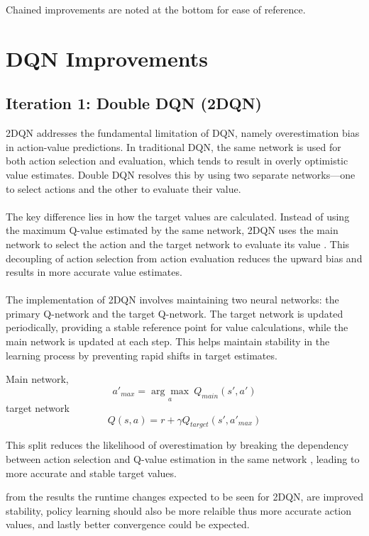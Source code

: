 \documentclass[
12pt, %
oneside, %
english, %
onehalfspacing, %
nolistspacing, %
liststotoc, %
headsepline, %
]{ProposalAndThesis} %
\begin{document}
Chained improvements are noted at the bottom for ease of reference.
\section{DQN Improvements}
\subsection{Iteration 1: Double DQN (2DQN)} 

2DQN \parencite{hasselt_deep_2015} addresses the fundamental limitation of DQN, namely overestimation bias in action-value predictions. In traditional DQN, the same network is used for both action selection and evaluation, which tends to result in overly optimistic value estimates. Double DQN resolves this by using two separate networks—one to select actions and the other to evaluate their value.
\\\\
\noindent The key difference lies in how the target values are calculated. Instead of using the maximum Q-value estimated by the same network, 2DQN uses the main network to select the action and the target network to evaluate its value \parencite{hasselt_deep_2015}. This decoupling of action selection from action evaluation reduces the upward bias and results in more accurate value estimates.
\\\\
\noindent The implementation of 2DQN involves maintaining two neural networks: the primary Q-network and the target Q-network. The target network is updated periodically, providing a stable reference point for value calculations, while the main network is updated at each step. This helps maintain stability in the learning process by preventing rapid shifts in target estimates.

Main network,
\[ a'_{max} = \underset{a}{\arg\max} \ Q_{main}(s', a')\]
target network
\[ Q(s,a) = r + \gamma Q_{target}(s',a'_{max})\]

\noindent This split reduces the likelihood of overestimation by breaking the dependency between action selection and Q-value estimation in the same network \parencite{hasselt_deep_2015}, leading to more accurate and stable target values.

\noindent from the results \parencite{hasselt_deep_2015} the runtime changes expected to be seen for 2DQN, are improved stability, policy learning should also be more relaible thus more accurate action values, and lastly better convergence could be expected.
\end{document}
